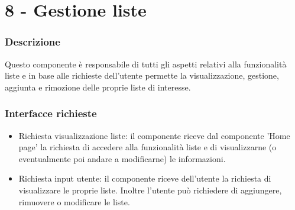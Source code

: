 \documentclass[a4paper,12pt]{article}
\begin{document}
\section*{8 -  Gestione liste}
\subsubsection*{Descrizione}
Questo componente è responsabile di tutti gli aspetti relativi alla funzionalità liste e in base alle richieste dell'utente permette la visualizzazione, gestione, aggiunta e rimozione delle proprie liste di interesse.
\subsubsection*{Interfacce richieste}
\begin{itemize} \setlength\itemsep{0.01em}
\item {\sffamily Richiesta visualizzazione liste}: il componente riceve dal componente 'Home page'  la richiesta di accedere alla funzionalità liste e di visualizzarne (o eventualmente poi andare a modificarne) le informazioni.
\item {\sffamily Richiesta input utente}: il componente riceve dell'utente la richiesta di visualizzare le proprie liste. Inoltre l'utente può richiedere di aggiungere, rimuovere o modificare le liste.

\end{itemize}
\end{document}
